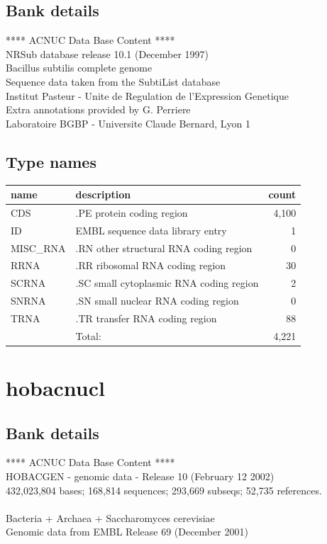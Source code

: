 \documentclass{article}
\begin{document}
\begin{Schunk}
\subsection{Bank details}
               ****     ACNUC Data Base Content      ****\\
               NRSub database release 10.1 (December 1997)\\
                    Bacillus subtilis complete genome\\
             Sequence data taken from the SubtiList database\\
     Institut Pasteur - Unite de Regulation de l'Expression Genetique\\
                Extra annotations provided by G. Perriere\\
           Laboratoire BGBP - Universite Claude Bernard, Lyon 1

\subsection{Type names}
\noindent\begin{tabular}{llr}
\hline \hline
name & description & count \\
\hline
CDS  &  .PE protein coding region  &  4,100 \\
ID  &  EMBL sequence data library entry  &  1 \\
MISC\_RNA  &  .RN other structural RNA coding region  &  0 \\
RRNA  &  .RR ribosomal RNA coding region  &  30 \\
SCRNA  &  .SC small cytoplasmic RNA coding region  &  2 \\
SNRNA  &  .SN small nuclear RNA coding region  &  0 \\
TRNA  &  .TR transfer RNA coding region  &  88 \\
\hline
 & Total: & 4,221 \\
\hline \hline
\end{tabular}

\section{ hobacnucl }
\subsection{Bank details}
               ****     ACNUC Data Base Content      ****                      \\
          HOBACGEN - genomic data - Release 10 (February 12 2002)\\
432,023,804 bases; 168,814 sequences; 293,669 subseqs; 52,735 references.\\
                                                                               \\
              Bacteria + Archaea + Saccharomyces cerevisiae\\
            Genomic data from EMBL Release 69 (December 2001)\\



\end{Schunk}
\end{document}
